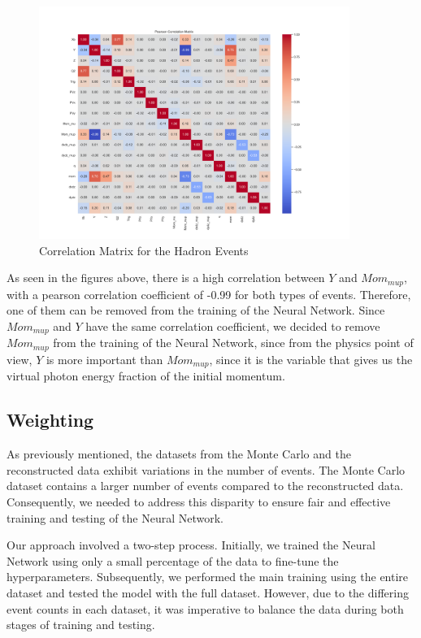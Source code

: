 \documentclass{article}
\begin{document}
\begin{figure}[H]
    \centering
    \includegraphics[width=0.9\textwidth]{graphs/hadron_correlation_matrix.png}
    \caption{Correlation Matrix for the Hadron Events}
    \label{fig:hadron_correlation_matrix}
\end{figure}


As seen in the figures above, there is a high correlation between $Y$ and $Mom_{mup}$, with
a pearson correlation coefficient of -0.99 for both types of events. Therefore, one of them can be removed from the training
of the Neural Network. Since $Mom_{mup}$ and $Y$ have the same correlation coefficient, we decided to remove $Mom_{mup}$ from the training of the Neural Network,
since from the physics point of view, $Y$ is more important than $Mom_{mup}$, since it is the variable that gives us the virtual photon energy fraction of the initial momentum. 

\subsection{Weighting}
As previously mentioned, the datasets from the Monte Carlo and the reconstructed data exhibit variations in the number of events. The Monte Carlo dataset contains a larger number of events compared to the reconstructed data. Consequently, we needed to address this disparity to ensure fair and effective training and testing of the Neural Network.

Our approach involved a two-step process. Initially, we trained the Neural Network using only a small percentage of the data to fine-tune the hyperparameters. Subsequently, we performed the main training using the entire dataset and tested the model with the full dataset. However, due to the differing event counts in each dataset, it was imperative to balance the data during both stages of training and testing.
\end{document}
